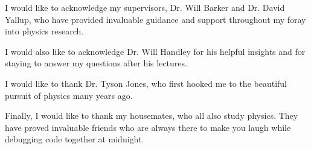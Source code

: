 \documentclass[aps,prd,reprint,preprintnumbers,showpacs,floatfix,nofootinbib,superscript address]{revtex4-2}
\begin{document}
I would like to acknowledge my supervisors, Dr. Will Barker and Dr. David Yallup, who have provided invaluable
guidance and support throughout my foray into physics research.

I would also like to acknowledge Dr. Will Handley for his helpful insights
and for staying to answer my questions after his lectures.

I would like to thank Dr. Tyson Jones, who first hooked me to the beautiful pursuit of physics many years ago.

Finally, I would like to thank my housemates, who all also study physics.
They have proved invaluable friends who are always there to make you laugh while debugging code together at midnight.





\end{document}
